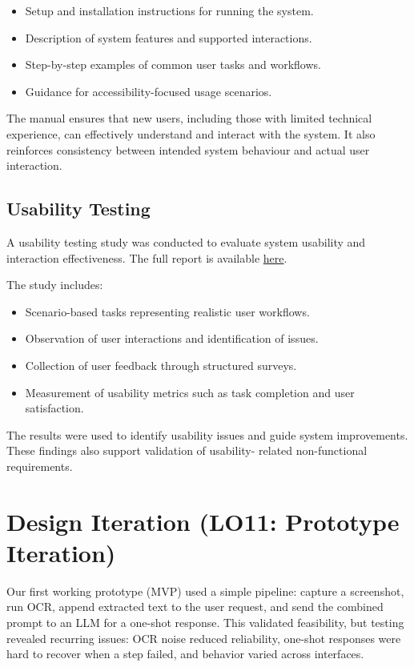 \documentclass{article}
\begin{document}
\begin{itemize}
\item Setup and installation instructions for running the system.
\item Description of system features and supported interactions.
\item Step-by-step examples of common user tasks and workflows.
\item Guidance for accessibility-focused usage scenarios.
\end{itemize}

The manual ensures that new users, including those with limited
technical experience, can effectively understand and interact with the
system. It also reinforces consistency between intended system
behaviour and actual user interaction.

\subsection*{Usability Testing}

A usability testing study was conducted to evaluate system usability and
interaction effectiveness. The full report is available
\href{../Extras/UsabilityTesting/UsabilityTesting.pdf}{here}.

The study includes:

\begin{itemize}
\item Scenario-based tasks representing realistic user workflows.
\item Observation of user interactions and identification of issues.
\item Collection of user feedback through structured surveys.
\item Measurement of usability metrics such as task completion and
user satisfaction.
\end{itemize}

The results were used to identify usability issues and guide system
improvements. These findings also support validation of usability-
related non-functional requirements.

\section{Design Iteration (LO11: Prototype Iteration)}

Our first working prototype (MVP) used a simple pipeline: capture a screenshot,
run OCR, append extracted text to the user request, and send the combined prompt
to an LLM for a one-shot response. This validated feasibility, but testing
revealed recurring issues: OCR noise reduced reliability, one-shot responses were
hard to recover when a step failed, and behavior varied across interfaces.
\end{document}

